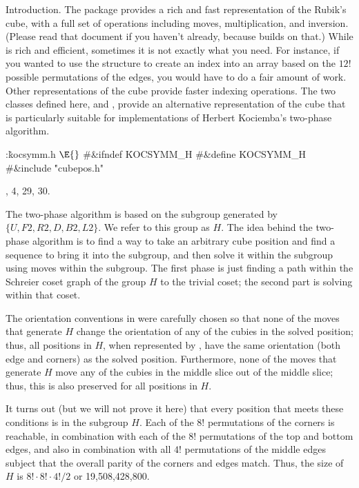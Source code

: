 
\def\mod{\mathop{mod}}


Introduction.
The  package provides a rich and fast representation of the
Rubik's cube, with a full set of operations including moves,
multiplication, and inversion.  (Please read that document if you
haven't already, because  builds on that.)  While 
is rich and efficient, sometimes it is not exactly what you need.  For
instance, if you wanted to use the  structure to create an
index into an array based on the $12!$ possible permutations of the
edges, you would have to do a fair amount of work.  Other
representations of the cube provide faster indexing operations.  The
two classes defined here,  and , provide an
alternative representation of the cube that is particularly suitable
for implementations of Herbert Kociemba's two-phase algorithm.

\Y\B\4:\.{kocsymm.h }\X${}\E{}$\6
\8\#\&{ifndef} \.{KOCSYMM\_H}\6
\8\#\&{define} \.{KOCSYMM\_H}\6
\8\#\&{include} \.{"cubepos.h"}\par
{}, 4, 29, 30.\fi

The two-phase algorithm is based on the subgroup generated by
$\{U,F2,R2,D,B2,L2\}$.  We refer to this group as $H$.  The idea
behind the two-phase algorithm is to find a way to take an arbitrary
cube position and find a sequence to bring it into the subgroup, and
then solve it within the subgroup using moves within the subgroup.
The first phase is just finding a path within the Schreier coset graph
of the group $H$ to the trivial coset; the second part is solving
within that coset.

The orientation conventions in  were carefully chosen so that
none of the moves that generate $H$ change the orientation of any of
the cubies in the solved position; thus, all positions in $H$, when
represented by , have the same orientation (both edge and
corners) as the solved position.  Furthermore, none of the moves that
generate $H$ move any of the cubies in the middle slice out of the
middle slice; thus, this is also preserved for all positions in $H$.

It turns out (but we will not prove it here) that every position that
meets these conditions is in the subgroup $H$.  Each of the $8!$
permutations of the corners is reachable, in combination with each of
the $8!$ permutations of the top and bottom edges, and also in
combination with all $4!$ permutations of the middle edges subject
that the overall parity of the corners and edges match.  Thus, the
size of $H$ is $8!\cdot 8!\cdot 4!/2$ or 19,508,428,800.

